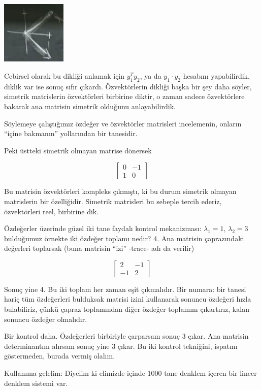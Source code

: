 \documentclass[12pt,fleqn]{article}\usepackage{../../common}
\begin{document}
\includegraphics[height=3cm]{5_5.png}

Cebirsel olarak bu dikliği anlamak için $y_1^Ty_2$, ya da $y_1 \cdot y_2$
hesabını yapabilirdik, diklik var ise sonuç sıfır çıkardı. Özvektörlerin
dikliği başka bir şey daha söyler, simetrik matrislerin özvektörleri
birbirine diktir, o zaman sadece özvektörlere bakarak ana matrisin simetrik
olduğunu anlayabilirdik.

Söylemeye çalıştığımız özdeğer ve özvektörler matrisleri incelemenin,
onların ``içine bakmanın'' yollarından bir tanesidir. 

Peki üstteki simetrik olmayan matrise dönersek

$$ 
\left[
\begin{array}{rr}
0 & -1 \\
1 & 0
\end{array}
\right]
 $$

Bu matrisin özvektörleri kompleks çıkmıştı, ki bu durum simetrik olmayan
matrislerin bir özelliğidir. Simetrik matrisleri bu sebeple tercih ederiz,
özvektörleri reel, birbirine dik.

Özdeğerler üzerinde güzel iki tane faydalı kontrol mekanizması: 
$\lambda_1 = 1$, $\lambda_2 = 3$ bulduğumuz örnekte iki özdeğer 
toplamı nedir? 4. Ana matrisin çaprazındaki değerleri toplarsak 
(buna matrisin ``izi'' -trace- adı da verilir)

$$ 
\left[\begin{array}{rr}
2 & -1 \\
-1 & 2
\end{array}\right]
 $$

Sonuç yine 4. Bu iki toplam her zaman eşit çıkmalıdır. Bir numara: bir
tanesi hariç tüm özdeğerleri bulduksak matrisi izini kullanarak sonuncu
özdeğeri hızla bulabiliriz, çünkü çapraz toplamından diğer özdeğer
toplamını çıkartırız, kalan sonuncu özdeğer olmalıdır.

Bir kontrol daha. Özdeğerleri birbiriyle çarparsam sonuç 3 çıkar. Ana
matrisin determinantını alırsam sonuç yine 3 çıkar. Bu iki kontrol
tekniğini, ispatını göstermeden, burada vermiş olalım. 

Kullanıma gelelim: Diyelim ki elimizde içinde 1000 tane denklem içeren bir
lineer denklem sistemi var. 
\end{document}
